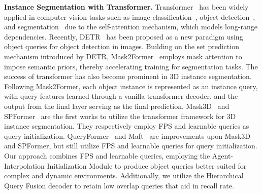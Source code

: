 {\bf Instance Segmentation with Transformer.}
Transformer~\cite{vaswani2017attention} has been widely applied in computer vision tasks such as image classification~\cite{dosovitskiy2020image, chen2021crossvit}, object detection~\cite{carion2020end, ding2019learning,wang2023long,deng2024diff3detr}, and segmentation~\cite{zheng2021rethinking, deng2025quantity, cheng2021per,cheng2022masked,lu2024bsnet,li2024mamba24} due to the self-attention mechanism, which models long-range dependencies. Recently, DETR~\cite{carion2020end} has been proposed as a new paradigm using object queries for object detection in images. Building on the set prediction mechanism introduced by DETR, Mask2Former~\cite{cheng2022masked} employs mask attention to impose semantic priors, thereby accelerating training for segmentation tasks. The success of transformer has also become prominent in 3D instance segmentation. Following Mask2Former, each object instance is represented as an instance query, with query features learned through a vanilla transformer decoder, and the output from the final layer serving as the final prediction. Mask3D~\cite{schult2022mask3d} and SPFormer~\cite{sun2023superpoint} are the first works to utilize the transformer framework for 3D instance segmentation. They respectively employ FPS and learnable queries as query initialization. QueryFormer~\cite{lu2023query} and Maft~\cite{lai2023mask} are improvements upon Mask3D and SPFormer, but still utilize FPS and learnable queries for query initialization. Our approach combines FPS and learnable queries, employing the Agent-Interpolation Initialization Module to produce object queries better suited for complex and dynamic environments. Additionally, we utilize the Hierarchical Query Fusion decoder to retain low overlap queries that aid in recall rate.
